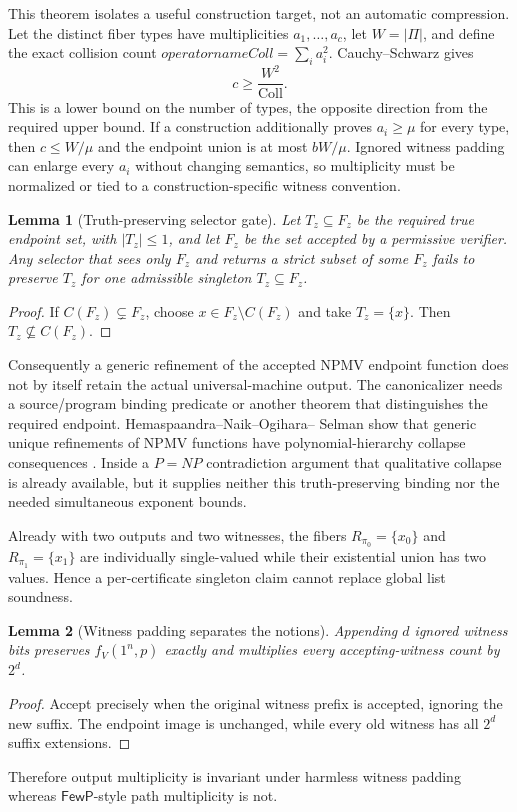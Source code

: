 \documentclass[11pt]{article}
\newtheorem{lemma}{Lemma}
\begin{document}
This theorem isolates a useful construction target, not an automatic
compression.  Let the distinct fiber types have multiplicities
$a_1,\ldots,a_c$, let $W=|\Pi|$, and define the exact collision count
\(operatorname{Coll}=\sum_i a_i^2\).  Cauchy--Schwarz gives
\[
 c\ge \frac{W^2}{\operatorname{Coll}}.
\]
This is a lower bound on the number of types, the opposite direction from
the required upper bound.  If a construction additionally proves
$a_i\ge\mu$ for every type, then $c\le W/\mu$ and the endpoint union is at
most $bW/\mu$.  Ignored witness padding can enlarge every $a_i$ without
changing semantics, so multiplicity must be normalized or tied to a
construction-specific witness convention.

\begin{lemma}[Truth-preserving selector gate]
Let $T_z\subseteq F_z$ be the required true endpoint set, with
$|T_z|\le1$, and let $F_z$ be the set accepted by a permissive verifier.
Any selector that sees only $F_z$ and returns a strict subset of some
$F_z$ fails to preserve $T_z$ for one admissible singleton
$T_z\subseteq F_z$.
\end{lemma}
\begin{proof}
If $C(F_z)\subsetneq F_z$, choose
$x\in F_z\setminus C(F_z)$ and take $T_z=\{x\}$.  Then
$T_z\nsubseteq C(F_z)$.
\end{proof}
Consequently a generic refinement of the accepted NPMV endpoint function
does not by itself retain the actual universal-machine output.  The
canonicalizer needs a source/program binding predicate or another theorem
that distinguishes the required endpoint.  Hemaspaandra--Naik--Ogihara--
Selman show that generic unique refinements of NPMV functions have
polynomial-hierarchy collapse consequences \cite{hnos1996}.  Inside a
$P=NP$ contradiction argument that qualitative collapse is already
available, but it supplies neither this truth-preserving binding nor the
needed simultaneous exponent bounds.

Already with two outputs and two witnesses, the fibers
$R_{\pi_0}=\{x_0\}$ and $R_{\pi_1}=\{x_1\}$ are individually
single-valued while their existential union has two values. Hence a
per-certificate singleton claim cannot replace global list soundness.

\begin{lemma}[Witness padding separates the notions]
Appending $d$ ignored witness bits preserves $f_V(1^n,p)$ exactly and
multiplies every accepting-witness count by $2^d$.
\end{lemma}
\begin{proof}
Accept precisely when the original witness prefix is accepted, ignoring
the new suffix. The endpoint image is unchanged, while every old
witness has all $2^d$ suffix extensions.
\end{proof}
Therefore output multiplicity is invariant under harmless witness
padding whereas $\mathsf{FewP}$-style path multiplicity is not.
\end{document}
